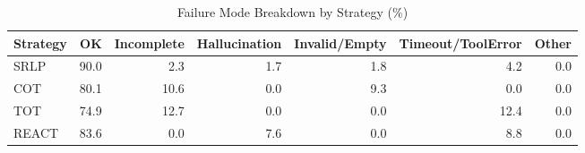 \begin{table}[htbp]
\centering
\caption{Failure Mode Breakdown by Strategy (\%)}
\label{tab:error_breakdown}
\begin{tabular}{lrrrrrr}
\toprule
Strategy & OK & Incomplete & Hallucination & Invalid/Empty & Timeout/ToolError & Other \\
\midrule
SRLP & 90.0 & 2.3 & 1.7 & 1.8 & 4.2 & 0.0 \\
COT & 80.1 & 10.6 & 0.0 & 9.3 & 0.0 & 0.0 \\
TOT & 74.9 & 12.7 & 0.0 & 0.0 & 12.4 & 0.0 \\
REACT & 83.6 & 0.0 & 7.6 & 0.0 & 8.8 & 0.0 \\
\bottomrule
\end{tabular}
\end{table}